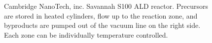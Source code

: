\begin{figure}[htb]
   \centering
	\hspace{1cm}
   \caption[Cambridge NanoTech, inc. S100 ALD System]%
   		{Cambridge NanoTech, inc. Savannah S100 ALD reactor. Precursors are stored in heated cylinders, flow up to the reaction zone, and byproducts are pumped out of the vacuum line on the right side. Each zone can be individually temperature controlled.}
   \label{fig:S100}
\end{figure}

